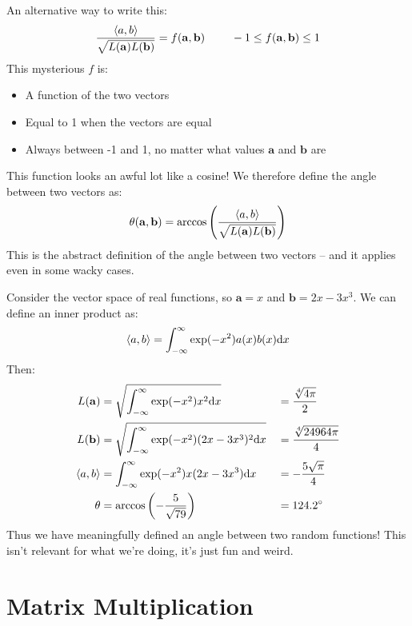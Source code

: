 \documentclass[a4paper,openany,11pt]{book}
\renewcommand\vec[1]{\boldsymbol{\mathbf{#1}}}
\begin{document}
			An alternative way to write this:
			\begin{equation}
				\frac{\inner{a}{b}}{\sqrt{L(\vec{a}) L(\vec{b})}}  = f(\vec{a},\vec{b})~~~~~~~ -1 \leq f(\vec{a},\vec{b}) \leq 1
			\end{equation}
			This mysterious $f$ is:
			\begin{itemize}
				\item A function of the two vectors
				\item Equal to 1 when the vectors are equal
				\item Always between -1 and 1, no matter what values $\vec{a}$ and $\vec{b}$ are
			\end{itemize}
			This function looks an awful lot like a cosine! We therefore define the angle between two vectors as:
			\begin{equation}
				\theta(\vec{a},\vec{b}) = \text{arccos}\left(\frac{\inner{a}{b}}{\sqrt{L(\vec{a}) L(\vec{b})}} \right)
			\end{equation} 
			This is the abstract definition of the angle between two vectors -- and it applies even in some wacky cases. 

			Consider the vector space of real functions, so $\vec{a} = x$ and $\vec{b} = 2x - 3x^3$. We can define an inner product as:
			\begin{equation}
				\left\langle a, b \right\rangle = \int_{-\infty}^{\infty} \exp(-x^2) a(x) b(x) \mathrm d x
			\end{equation}
			Then:
			\begin{alignat*}{2}
				L(\vec{a})& =\sqrt{ \int_{-\infty}^{\infty} \exp(-x^2) x^2 \d x } &&= \frac{\sqrt[4]{4\pi}}{2}
				\\
				L(\vec{b})& = \sqrt{\int_{-\infty}^{\infty} \exp(-x^2) (2x - 3x^3)^2 \d x} &&= \frac{\sqrt[4]{24964\pi}}{4}
				\\
				\inner{a}{b} & = \int_{-\infty}^{\infty} \exp(-x^2) x(2x - 3x^3) \d x &&= - \frac{5 \sqrt{\pi}}{4}
				\\
				\theta & = \text{arccos}\left(- \frac{5}{\sqrt{79}}\right) && = 124.2^\circ
			\end{alignat*}
			Thus we have meaningfully defined an angle between two random functions! This isn't relevant for what we're doing, it's just fun and weird.

		\chapter{Matrix Multiplication}\label{Int:Matrices}
\end{document}
